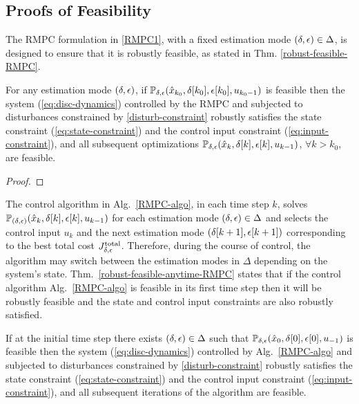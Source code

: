 \subsection{Proofs of Feasibility}
The RMPC formulation in \eqref{RMPC1}, with a fixed estimation mode
$\left(\delta,\epsilon\right)\in\Delta$, is designed to ensure that
it is robustly feasible, as stated in Thm. \ref{robust-feasible-RMPC}.
\begin{thm}
\label{thm:robust-feasible-RMPC} For
any estimation mode $\left(\delta,\epsilon\right)$, if $\mathbb{P_{\delta,\epsilon}}(\hat{x}_{k_{0}},\delta[k_{0}],\epsilon[k_{0}],u_{k_{0}-1})$
is feasible then the system (\ref{eq:disc-dynamics}) controlled by
the RMPC and subjected to disturbances constrained by \eqref{disturb-constraint}
robustly satisfies the state constraint (\ref{eq:state-constraint})
and the control input constraint (\ref{eq:input-constraint}), and
all subsequent optimizations $\mathbb{P_{\delta,\epsilon}}(\hat{x}_{k},\delta[k],\epsilon[k],u_{k-1})$,
$\forall k>k_{0}$, are feasible.
\end{thm}
\begin{proof}

\end{proof}
The control algorithm in Alg.~\ref{RMPC-algo}, in each time step $k$, solves $\mathbb{P_{(\delta,\epsilon)}}(\hat{x}_{k},\delta[k],\epsilon[k],u_{k-1})$ for each estimation mode $\left(\delta,\epsilon\right)\in\Delta$ and selects the control input $u_{k}$ and the next estimation mode $\left(\delta[k+1],\epsilon[k+1]\right)$
corresponding to the best total cost $J_{\delta,\epsilon}^{\mathrm{total}}$.
Therefore, during the course of control, the algorithm may switch between the estimation modes in $\Delta$ depending on the system's state. Thm.~\ref{robust-feasible-anytime-RMPC} states that if the control algorithm Alg.~\ref{RMPC-algo} is feasible in its first time step then it will be robustly feasible and the state and control input constraints are also robustly satisfied.
\begin{thm}%
\label{thm:robust-feasible-anytime-RMPC}
If at the initial time step there exists $\left(\delta,\epsilon\right)\in\Delta$
such that $\mathbb{P_{\delta,\epsilon}}(\hat{x}_{0},\delta[0],\epsilon[0],u_{-1})$
is feasible then the system (\ref{eq:disc-dynamics}) controlled by
Alg.~\ref{RMPC-algo} and subjected to disturbances constrained
by \eqref{disturb-constraint} robustly satisfies the state constraint
(\ref{eq:state-constraint}) and the control input constraint (\ref{eq:input-constraint}),
and all subsequent iterations of the algorithm are feasible.
\end{thm}
